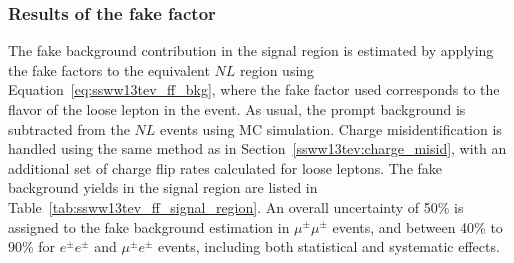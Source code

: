 

%
\subsubsection{Results of the fake factor}\label{ssww13tev:ff_results}
The fake background contribution in the signal region is estimated by applying the fake factors to the equivalent $NL$ region using Equation~\ref{eq:ssww13tev_ff_bkg}, where the fake factor used corresponds to the flavor of the loose lepton in the event.
As usual, the prompt background is subtracted from the $NL$ events using MC simulation.
Charge misidentification is handled using the same method as in Section~\ref{ssww13tev:charge_misid}, with an additional set of charge flip rates calculated for loose leptons.
The fake background yields in the signal region are listed in Table~\ref{tab:ssww13tev_ff_signal_region}.
An overall uncertainty of 50\% is assigned to the fake background estimation in $\mu^{\pm}\mu^{\pm}$ events, and between 40\% to 90\% for $e^{\pm}e^{\pm}$ and $\mu^{\pm}e^{\pm}$ events, including both statistical and systematic effects.

\begin{table}[hbtp]
\centering
\caption{Estimated yields for the fake lepton background. The estimated yield is shown in the first column together with the statistical uncertainty followed by the systematic uncertainties from variations of the the fake factors within their statistical (stat.) and systematic (syst.) uncertainties. The labels $f_e$ and $f_\mu$ indicate the fake factors for electrons and muons, respectively.}
  \label{tab:ssww13tev_ff_signal_region}
\end{table}

